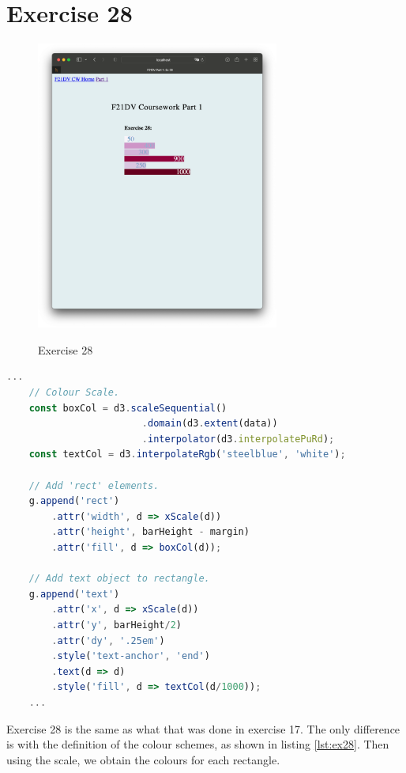 \documentclass{scrreprt}
\begin{document}
\newpage
\section{Exercise 28}
\begin{figure}[!ht]
    \centering
    \includegraphics[width = 8cm]{images/ex28.png}
    \label{fig:ex28}
    \caption{Exercise 28}
\end{figure}
\begin{lstlisting}[language=JavaScript,
    caption={abstract from task28.js},
    captionpos=b,
    label={lst:ex28}]
    ...
    // Colour Scale.
    const boxCol = d3.scaleSequential()
                        .domain(d3.extent(data))
                        .interpolator(d3.interpolatePuRd);
    const textCol = d3.interpolateRgb('steelblue', 'white');
    
    // Add 'rect' elements.
    g.append('rect')
        .attr('width', d => xScale(d))
        .attr('height', barHeight - margin)
        .attr('fill', d => boxCol(d));
    
    // Add text object to rectangle.
    g.append('text')
        .attr('x', d => xScale(d))
        .attr('y', barHeight/2)
        .attr('dy', '.25em')
        .style('text-anchor', 'end')
        .text(d => d)
        .style('fill', d => textCol(d/1000));
    ...
\end{lstlisting}
Exercise 28 is the same as what that was done in exercise 17. The only difference is with the definition
of the colour schemes, as shown in listing \ref{lst:ex28}. Then using the scale, we obtain the colours
for each rectangle.

\newpage
\end{document}
